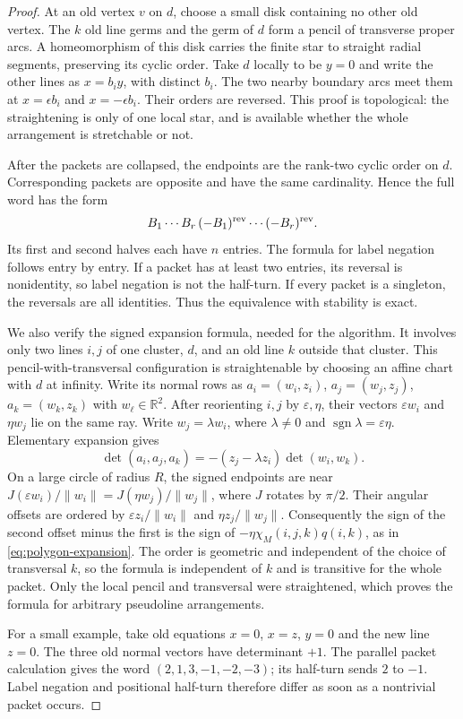 \begin{proof}

At an old vertex $v$ on $d$, choose a small disk containing no other
old vertex.  The $k$ old line germs and the germ of $d$ form a pencil
of transverse proper arcs.  A homeomorphism of this disk carries
the finite star to straight radial segments, preserving its cyclic
order.  Take $d$ locally to be $y=0$ and write the other lines as
$x=b_i y$, with distinct $b_i$.  The two nearby boundary arcs meet
them at $x=\epsilon b_i$ and $x=-\epsilon b_i$.  Their orders are
reversed.  This proof is topological: the straightening is only of
one local star, and is available whether the whole arrangement is
stretchable or not.

After the packets are collapsed, the endpoints are the rank-two
cyclic order on $d$.  Corresponding packets are opposite and have
the same cardinality.  Hence the full word has the form
\[
       B_1\cdots B_r\,(-B_1)^{\rm rev}\cdots(-B_r)^{\rm rev}.
\]
Its first and second halves each have $n$ entries.  The formula for
label negation follows entry by entry.  If a packet has at least two
entries, its reversal is nonidentity, so label negation is not the
half-turn.  If every packet is a singleton, the reversals are all
identities.  Thus the equivalence with stability is exact.

We also verify the signed expansion formula, needed for the
algorithm.  It involves only two lines $i,j$ of one cluster, $d$,
and an old line $k$ outside that cluster.  This pencil-with-transversal
configuration is straightenable by choosing an affine chart with
$d$ at infinity.  Write its normal rows as $a_i=(w_i,z_i)$,
$a_j=(w_j,z_j)$, $a_k=(w_k,z_k)$ with $w_\ell\in\mathbb R^2$.
After reorienting $i,j$ by $\varepsilon,\eta$, their vectors
$\varepsilon w_i$ and $\eta w_j$ lie on the same ray. Write
$w_j=\lambda w_i$, where $\lambda\ne0$ and
$\operatorname{sgn}\lambda=\varepsilon\eta$. Elementary expansion gives
\[
 \det(a_i,a_j,a_k)=-(z_j-\lambda z_i)\det(w_i,w_k).
\]
On a large circle of radius $R$, the signed endpoints are near
$J(\varepsilon w_i)/\|w_i\|=J(\eta w_j)/\|w_j\|$, where $J$
rotates by $\pi/2$. Their angular offsets are ordered by
$\varepsilon z_i/\|w_i\|$ and $\eta z_j/\|w_j\|$.
Consequently the sign of the second offset minus the first is the sign of
$-\eta\chi_M(i,j,k)q(i,k)$, as in
\eqref{eq:polygon-expansion}.  The order is geometric and independent of
the choice of transversal $k$, so the formula is independent of $k$
and is transitive for the whole packet.  Only the local pencil and
transversal were straightened, which proves the formula for arbitrary
pseudoline arrangements.

For a small example, take old equations $x=0$, $x=z$, $y=0$
and the new line $z=0$. The three old normal vectors have determinant
$+1$. The parallel packet calculation gives the word
$(2,1,3,-1,-2,-3)$; its half-turn sends $2$ to $-1$.
Label negation and positional half-turn therefore differ as soon as
a nontrivial packet occurs.
\end{proof}

